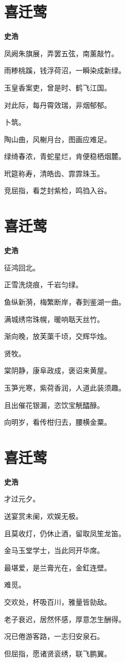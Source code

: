 \documentclass[12pt,a4paper]{ctexbook}
\begin{document}
\section{喜迁莺}
\textbf{史浩}\par\vspace{0.5em}
凤阙朱旗展，弄罢五弦，南薰敲竹。\par
雨糁桃蹊，钱浮荷沼，一瞬染成新绿。\par
玉皇香案吏，曾是时、鹤飞江国。\par
对此际，每丹霄效瑞，非烟郁郁。\par
卜筑。\par
陶山曲，风榭月台，图画应难足。\par
绿绮春浓，青蛇星烂，肯便稳栖烟麓。\par
玳筵称寿，清皓齿、霏霏珠玉。\par
竞屈指，看芝封紫检，鸣驺入谷。\par

\section{喜迁莺}
\textbf{史浩}\par\vspace{0.5em}
征鸿回北。\par
正雪洗烧痕，千岩匀绿。\par
鱼纵新漪，梅繁断岸，春到鉴湖一曲。\par
满城绣帘珠幌，暖响聒天丝竹。\par
渐向晚，放芙蕖千顷，交辉华烛。\par
贤牧。\par
棠阴静，康阜政成，褒诏来黄屋。\par
玉笋光寒，紫荷香润，人道此装须趣。\par
且出催花银漏，恣饮宝觥醽醁。\par
向明岁，看传柑归去，腰横金粟。\par

\section{喜迁莺}
\textbf{史浩}\par\vspace{0.5em}
才过元夕。\par
送宴赏未阑，欢娱无极。\par
且莫收灯，仍休止酒，留取凤笙龙笛。\par
金马玉堂学士，当此同开华席。\par
最堪爱，是兰膏光在，金釭连壁。\par
难觅。\par
交欢处，杯吸百川，雅量皆勍敌。\par
老子衰迟，居然怀感，厚意怎生酬得。\par
况已倦游客路，一志归安泉石。\par
但屈指，愿诸贤衮绣，联飞鹏翼。\par
\end{document}
